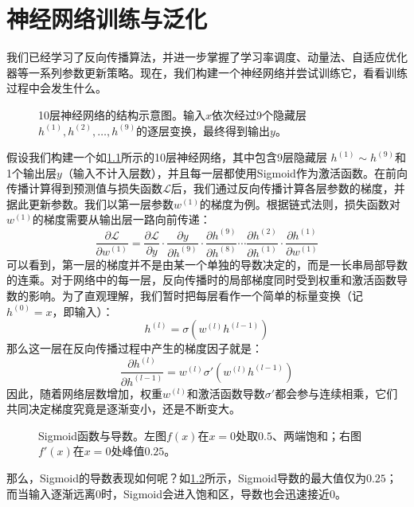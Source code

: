 
\chapter{神经网络训练与泛化}

我们已经学习了反向传播算法，并进一步掌握了学习率调度、动量法、自适应优化器等一系列参数更新策略。现在，我们构建一个神经网络并尝试训练它，看看训练过程中会发生什么。

\begin{figure}[H]
    \caption{10层神经网络的结构示意图。输入$x$依次经过9个隐藏层$h^{(1)}, h^{(2)}, \dots, h^{(9)}$的逐层变换，最终得到输出$y$。}
    \label{fig:network}
\end{figure}

假设我们构建一个如\cref{fig:network}所示的10层神经网络，其中包含9层隐藏层 $h^{(1)} \sim h^{(9)}$和1个输出层$y$（输入不计入层数），并且每一层都使用Sigmoid作为激活函数。在前向传播计算得到预测值与损失函数$\mathcal{L}$后，我们通过反向传播计算各层参数的梯度，并据此更新参数。我们以第一层参数$w^{(1)}$的梯度为例。根据链式法则，损失函数对$w^{(1)}$的梯度需要从输出层一路向前传递：
$$
\frac{\partial \mathcal{L}}{\partial w^{(1)}} = \frac{\partial \mathcal{L}}{\partial y} \cdot \frac{\partial y}{\partial h^{(9)}} \cdot \frac{\partial h^{(9)}}{\partial h^{(8)}} \cdots \frac{\partial h^{(2)}}{\partial h^{(1)}} \cdot \frac{\partial h^{(1)}}{\partial w^{(1)}}
$$
可以看到，第一层的梯度并不是由某一个单独的导数决定的，而是一长串局部导数的连乘。对于网络中的每一层，反向传播时的局部梯度同时受到权重和激活函数导数的影响。为了直观理解，我们暂时把每层看作一个简单的标量变换（记$h^{(0)} = x$，即输入）：
$$
h^{(l)}=\sigma\left(w^{(l)}h^{(l-1)}\right)
$$
那么这一层在反向传播过程中产生的梯度因子就是：
$$
\frac{\partial h^{(l)}}{\partial h^{(l-1)}}=w^{(l)}\sigma'\left(w^{(l)}h^{(l-1)}\right)
$$
因此，随着网络层数增加，权重$w^{(l)}$和激活函数导数$\sigma'$都会参与连续相乘，它们共同决定梯度究竟是逐渐变小，还是不断变大。

\begin{figure}[H]
    \caption{Sigmoid函数与导数。左图$f(x)$在$x=0$处取$0.5$、两端饱和；右图$f'(x)$在$x=0$处峰值$0.25$。}
    \label{fig:sigmoid_function}
\end{figure}

那么，Sigmoid的导数表现如何呢？如\cref{fig:sigmoid_function}所示，Sigmoid导数的最大值仅为$0.25$；而当输入逐渐远离$0$时，Sigmoid会进入饱和区，导数也会迅速接近$0$。

